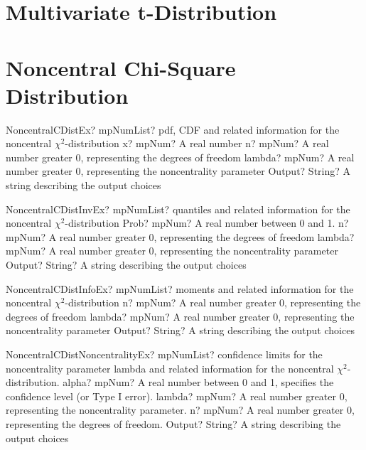 \documentclass[12pt,a4paper,openany]{book}
\begin{document}
\section{Multivariate t-Distribution}

\section{Noncentral Chi-Square Distribution}

\begin{mpFunctionsExtract}
\mpFunctionFourNotImplemented
{NoncentralCDistEx? mpNumList? pdf, CDF and related information for the noncentral $\chi^2$-distribution}
{x? mpNum? A real number}
{n? mpNum? A real number greater 0, representing the degrees of freedom}
{lambda? mpNum? A real number greater 0, representing the noncentrality parameter}
{Output? String? A string describing the output choices}
\end{mpFunctionsExtract}

\begin{mpFunctionsExtract}
\mpFunctionFourNotImplemented
{NoncentralCDistInvEx? mpNumList? quantiles and related information for the noncentral $\chi^2$-distribution}
{Prob? mpNum? A real number between 0 and 1.}
{n? mpNum? A real number greater 0, representing the degrees of freedom}
{lambda? mpNum? A real number greater 0, representing the noncentrality parameter}
{Output? String? A string describing the output choices}
\end{mpFunctionsExtract}

\begin{mpFunctionsExtract}
\mpFunctionThreeNotImplemented
{NoncentralCDistInfoEx? mpNumList? moments and related information for the noncentral $\chi^2$-distribution}
{n? mpNum? A real number greater 0, representing the degrees of freedom}
{lambda? mpNum? A real number greater 0, representing the noncentrality parameter}
{Output? String? A string describing the output choices}
\end{mpFunctionsExtract}

\begin{mpFunctionsExtract}
\mpFunctionFourNotImplemented
{NoncentralCDistNoncentralityEx? mpNumList? confidence limits for the noncentrality parameter lambda and related information for the noncentral $\chi^2$-distribution.}
{alpha? mpNum? A real number between 0 and 1, specifies the confidence level (or Type I error).}
{lambda? mpNum? A real number greater 0, representing the noncentrality parameter.}
{n? mpNum? A real number greater 0, representing the degrees of freedom.}
{Output? String? A string describing the output choices}
\end{mpFunctionsExtract}
\end{document}
